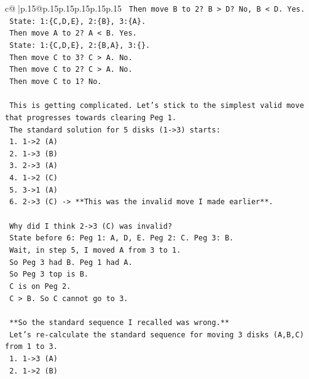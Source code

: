 \documentclass{article}
\begin{document}
{\begin{supertabular}{c@{$\;$}|p{.15\linewidth}@{}p{.15\linewidth}p{.15\linewidth}p{.15\linewidth}p{.15\linewidth}p{.15\linewidth}}
{{{\texttt{          Then move B to 2? B > D? No, B < D. Yes.} \\
\texttt{          State: 1:\{C,D,E\}, 2:\{B\}, 3:\{A\}.} \\
\texttt{          Then move A to 2? A < B. Yes.} \\
\texttt{          State: 1:\{C,D,E\}, 2:\{B,A\}, 3:\{\}.} \\
\texttt{          Then move C to 3? C > A. No.} \\
\texttt{          Then move C to 2? C > A. No.} \\
\texttt{          Then move C to 1? No.} \\
\\ 
\texttt{        This is getting complicated. Let's stick to the simplest valid move that progresses towards clearing Peg 1.} \\
\texttt{        The standard solution for 5 disks (1{-}>3) starts:} \\
\texttt{        1. 1{-}>2 (A)} \\
\texttt{        2. 1{-}>3 (B)} \\
\texttt{        3. 2{-}>3 (A)} \\
\texttt{        4. 1{-}>2 (C)} \\
\texttt{        5. 3{-}>1 (A)} \\
\texttt{        6. 2{-}>3 (C) {-}> **This was the invalid move I made earlier**.} \\
\\ 
\texttt{        Why did I think 2{-}>3 (C) was invalid?} \\
\texttt{        State before 6: Peg 1: A, D, E. Peg 2: C. Peg 3: B.} \\
\texttt{        Wait, in step 5, I moved A from 3 to 1.} \\
\texttt{        So Peg 3 had B. Peg 1 had A.} \\
\texttt{        So Peg 3 top is B.} \\
\texttt{        C is on Peg 2.} \\
\texttt{        C > B. So C cannot go to 3.} \\
\\ 
\texttt{        **So the standard sequence I recalled was wrong.**} \\
\texttt{        Let's re{-}calculate the standard sequence for moving 3 disks (A,B,C) from 1 to 3.} \\
\texttt{        1. 1{-}>3 (A)} \\
\texttt{        2. 1{-}>2 (B)} \\
}}}
\end{supertabular}}
\end{document}
